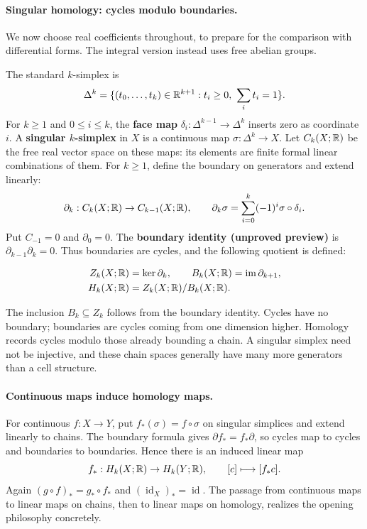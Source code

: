 \paragraph{Singular homology: cycles modulo boundaries.}
We now choose real coefficients throughout, to prepare for the comparison
with differential forms. The integral version instead uses free abelian groups.
\begin{definition}
The standard $k$-simplex is
\[
\Delta^k=\{(t_0,\ldots,t_k)\in\R^{k+1}:t_i\geq0,\ \sum_i t_i=1\}.
\]
For $k\geq1$ and $0\leq i\leq k$, the \textbf{face map}
$\delta_i:\Delta^{k-1}\to\Delta^k$ inserts zero as coordinate $i$.
A \textbf{singular $k$-simplex} in $X$ is a continuous map
$\sigma:\Delta^k\to X$. Let $C_k(X;\mathbb{R})$ be the free real vector space on
these maps: its elements are finite formal linear combinations of them.
For $k\geq1$, define the boundary on generators and extend linearly:
\[
\partial_k:C_k(X;\mathbb{R})\to C_{k-1}(X;\mathbb{R}),\qquad
\partial_k\sigma=\sum_{i=0}^k(-1)^i\sigma\circ\delta_i.
\]
Put $C_{-1}=0$ and $\partial_0=0$.
The \textbf{boundary identity (unproved preview)} is
$\partial_{k-1}\partial_k=0$. Thus boundaries are cycles, and the following
quotient is defined:

\[
\begin{aligned}
Z_k(X;\mathbb{R})&=\ker\partial_k,\qquad
B_k(X;\mathbb{R})=\operatorname{im}\partial_{k+1},\\
H_k(X;\mathbb{R})&=Z_k(X;\mathbb{R})/B_k(X;\mathbb{R}).
\end{aligned}
\]
\end{definition}
The inclusion $B_k\subseteq Z_k$ follows from the boundary identity.
Cycles have no boundary; boundaries are cycles
coming from one dimension higher. Homology records cycles modulo those
already bounding a chain. A singular simplex need not be injective, and
these chain spaces generally have many more generators than a cell structure.

\paragraph{Continuous maps induce homology maps.}
For continuous $f:X\to Y$, put $f_*(\sigma)=f\circ\sigma$ on singular
simplices and extend linearly to chains. The boundary formula gives
$\partial f_*=f_*\partial$, so cycles map to cycles and boundaries to
boundaries. Hence there is an induced linear map
\[
f_*:H_k(X;\mathbb{R})\to H_k(Y;\mathbb{R}),\qquad [c]\longmapsto[f_*c].
\]
Again $(g\circ f)_*=g_*\circ f_*$ and $(\operatorname{id}_X)_*=\operatorname{id}$.
The passage from continuous maps to linear maps on chains, then to linear
maps on homology, realizes the opening philosophy concretely.

